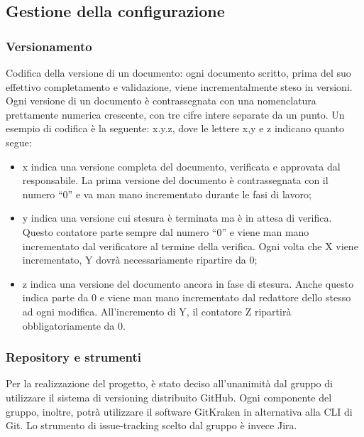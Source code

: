 \subsection{Gestione della configurazione}

\subsubsection{Versionamento}
Codifica della versione di un documento:
ogni documento scritto, prima del suo effettivo completamento e validazione, viene incrementalmente steso in versioni. Ogni versione di un documento è contrassegnata con una nomenclatura prettamente numerica crescente, con tre cifre intere separate da un punto. Un esempio di codifica è la seguente: x.y.z, dove le lettere x,y e z indicano quanto segue:
\begin{itemize}
	\item x indica una versione completa del documento, verificata e approvata dal responsabile. La prima versione del documento è contrassegnata con il numero “0” e va man mano incrementato durante le fasi di lavoro;
	\item y indica una versione cui stesura è terminata ma è in attesa di verifica. Questo contatore parte sempre dal numero “0” e viene man mano incrementato dal verificatore al termine della verifica. Ogni volta che X viene incrementato, Y dovrà necessariamente ripartire da 0;
	\item z indica una versione del documento ancora in fase di stesura. Anche questo indica parte da 0 e viene man mano incrementato dal redattore dello stesso ad ogni modifica. All’incremento di Y, il contatore Z ripartirà obbligatoriamente da 0.
	\end{itemize}

\subsubsection{Repository e strumenti}
Per la realizzazione del progetto, è stato deciso all’unanimità dal gruppo di utilizzare il sistema di versioning distribuito GitHub. Ogni componente del gruppo, inoltre, potrà utilizzare il software GitKraken in alternativa alla CLI di Git. Lo strumento di issue-tracking scelto dal gruppo è invece Jira.

